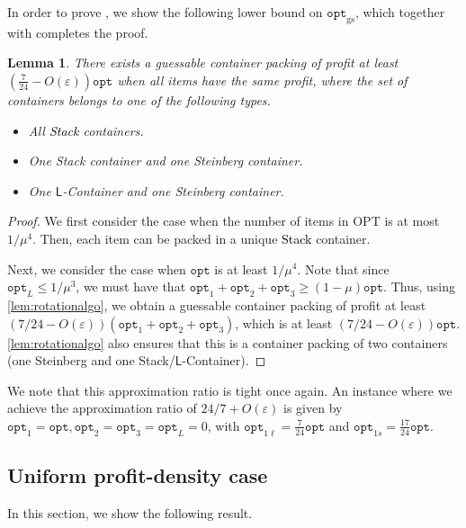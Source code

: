 \documentclass[10pt,a4paper]{amsart}
\newcommand{\kvnnew}[1]{\textcolor{black}{#1}}
\newcommand{\mt}[1]{#1}
\newcommand{\kvnr}[1]{}
\newcommand{\eps}{\varepsilon}
\newtheorem{lemma}[theorem]{Lemma}
\theoremstyle{definition}
\newcommand{\alg}{\mathtt{opt}_{\mathrm{gs}}}
\newcommand{\opt}{\mathtt{opt}}
\newcommand{\LContainer}{$\mathsf{L}$-Container}
\newcommand{\OPT}{\mathrm{OPT}}
\begin{document}
In order to prove , we show the following lower bound on $\alg$, which together with  completes the proof.

\begin{lemma}
    There exists a guessable container packing of profit at least $\left(\frac{7}{24}-O(\eps)\right)\opt$ when all items have the same profit, where the set of containers belongs to one of the following types.
    \begin{itemize}
        \item All \kvnnew{Stack} containers.
        \item One Stack container and one Steinberg container.
        \item One \LContainer{} and one Steinberg container.
    \end{itemize}
\end{lemma}
\begin{proof}
    We first consider the case when the number of items in $\OPT$ is at most $1/\mu^4$.
    Then, each item can be packed in a unique \kvnnew{Stack} container.

    Next, we consider the case when $\opt$ is at least $1/\mu^4$. Note that since $\opt_L\le 1/\mu^3$, we must have that $\opt_1+\opt_2+\opt_3\ge (1-\mu)\opt$.
    Thus, using \cref{lem:rotationalgo}, we obtain a guessable container packing of profit at least $(7/24-O(\eps))(\opt_1+\opt_2+\opt_3)$, which is at least $(7/24-O(\eps))\opt$.
    \cref{lem:rotationalgo} also ensures that this is a container packing of two containers (one Steinberg and one Stack/\LContainer{}).
\end{proof}
\mt{We note that this approximation ratio is tight once again. An instance where we  achieve the approximation ratio of $24/7+O(\eps)$ is given by $\opt_1=\opt,\opt_2=\opt_3=\opt_L=0$, with $\opt_{1\ell}=\frac{7}{24}\opt$ and $\opt_{1s}=\frac{17}{24}\opt$.}
\subsection{Uniform profit-density case}
\label{sec:tdkrp}
In this section, we show the following result.
\end{document}
